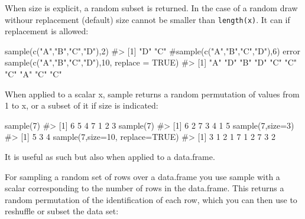 \documentclass[
  letterpaper,
  DIV=11,
  numbers=noendperiod]{scrreprt}
\newenvironment{Shaded}{\begin{snugshade}}{\end{snugshade}}
\newcommand{\AttributeTok}[1]{\textcolor[rgb]{0.40,0.45,0.13}{#1}}
\newcommand{\CommentTok}[1]{\textcolor[rgb]{0.37,0.37,0.37}{#1}}
\newcommand{\ConstantTok}[1]{\textcolor[rgb]{0.56,0.35,0.01}{#1}}
\newcommand{\DecValTok}[1]{\textcolor[rgb]{0.68,0.00,0.00}{#1}}
\newcommand{\FunctionTok}[1]{\textcolor[rgb]{0.28,0.35,0.67}{#1}}
\newcommand{\NormalTok}[1]{\textcolor[rgb]{0.00,0.23,0.31}{#1}}
\newcommand{\StringTok}[1]{\textcolor[rgb]{0.13,0.47,0.30}{#1}}
\begin{document}
When size is explicit, a random subset is returned. In the case of a
random draw withour replacement (default) size cannot be smaller than
\texttt{length(x)}. It can if replacement is allowed:

\begin{Shaded}
\begin{Highlighting}[]
\FunctionTok{sample}\NormalTok{(}\FunctionTok{c}\NormalTok{(}\StringTok{"A"}\NormalTok{,}\StringTok{"B"}\NormalTok{,}\StringTok{"C"}\NormalTok{,}\StringTok{"D"}\NormalTok{),}\DecValTok{2}\NormalTok{)}
\CommentTok{\#\textgreater{} [1] "D" "C"}
\CommentTok{\#sample(c("A","B","C","D"),6) error}
\FunctionTok{sample}\NormalTok{(}\FunctionTok{c}\NormalTok{(}\StringTok{"A"}\NormalTok{,}\StringTok{"B"}\NormalTok{,}\StringTok{"C"}\NormalTok{,}\StringTok{"D"}\NormalTok{),}\DecValTok{10}\NormalTok{, }\AttributeTok{replace =} \ConstantTok{TRUE}\NormalTok{)}
\CommentTok{\#\textgreater{}  [1] "A" "D" "B" "D" "C" "C" "C" "A" "C" "C"}
\end{Highlighting}
\end{Shaded}

When applied to a scalar x, sample returns a random permutation of
values from 1 to x, or a subset of it if size is indicated:

\begin{Shaded}
\begin{Highlighting}[]
\FunctionTok{sample}\NormalTok{(}\DecValTok{7}\NormalTok{)}
\CommentTok{\#\textgreater{} [1] 6 5 4 7 1 2 3}
\FunctionTok{sample}\NormalTok{(}\DecValTok{7}\NormalTok{)}
\CommentTok{\#\textgreater{} [1] 6 2 7 3 4 1 5}
\FunctionTok{sample}\NormalTok{(}\DecValTok{7}\NormalTok{,}\AttributeTok{size=}\DecValTok{3}\NormalTok{)}
\CommentTok{\#\textgreater{} [1] 5 3 4}
\FunctionTok{sample}\NormalTok{(}\DecValTok{7}\NormalTok{,}\AttributeTok{size=}\DecValTok{10}\NormalTok{, }\AttributeTok{replace=}\ConstantTok{TRUE}\NormalTok{)}
\CommentTok{\#\textgreater{}  [1] 3 1 2 1 7 1 2 7 3 2}
\end{Highlighting}
\end{Shaded}

It is useful as such but also when applied to a data.frame.

For sampling a random set of rows over a data.frame you use sample with
a scalar corresponding to the number of rows in the data.frame. This
returns a random permutation of the identification of each row, which
you can then use to reshuffle or subset the data set:
\end{document}
